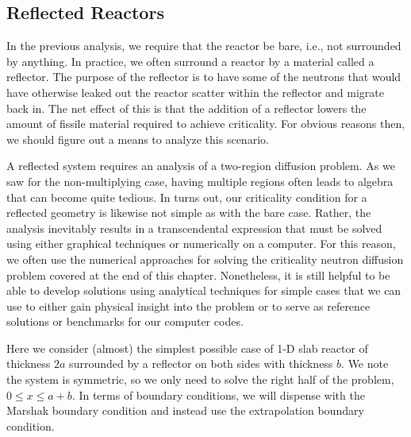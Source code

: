 \subsection{Reflected Reactors}

In the previous analysis, we require that the reactor be bare, i.e., not surrounded by anything. In practice, we often surround a reactor by a material called a reflector. The purpose of the reflector is to have some of the neutrons that would have otherwise leaked out the reactor scatter within the reflector and migrate back in. The net effect of this is that the addition of a reflector lowers the amount of fissile material required to achieve criticality. For obvious reasons then, we should figure out a means to analyze this scenario.

A reflected system requires an analysis of a two-region diffusion problem. As we saw for the non-multiplying case, having multiple regions often leads to algebra that can become quite tedious. In turns out, our criticality condition for a reflected geometry is likewise not simple as with the bare case. Rather, the analysis inevitably results in a transcendental expression that must be solved using either graphical techniques or numerically on a computer. For this reason, we often use the numerical approaches for solving the criticality neutron diffusion problem covered at the end of this chapter. Nonetheless, it is still helpful to be able to develop solutions using analytical techniques for simple cases that we can use to either gain physical insight into the problem or to serve as reference solutions or benchmarks for our computer codes.

Here we consider (almost) the simplest possible case of 1-D slab reactor of thickness $2a$ surrounded by a reflector on both sides with thickness $b$. We note the system is symmetric, so we only need to solve the right half of the problem, $0 \le x \le a+b$. In terms of boundary conditions, we will dispense with the Marshak boundary condition and instead use the extrapolation boundary condition. 

